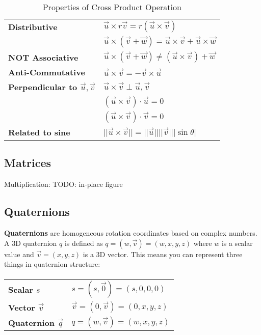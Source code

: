 \documentclass{article}
\begin{document}
\begin{table}[H]
	\centering
	\begin{tabular}{ll}
	\textbf{Distributive} & $ \vec{u} \times r \vec{v} = r(\vec{u} \times \vec{v}) $ \\
	& $ \vec{u} \times (\vec{v} + \vec{w}) =  \vec{u} \times \vec{v} + \vec{u} \times \vec{w} $ \\
	\textbf{NOT Associative} & $\vec{u} \times (\vec{v} + \vec{w}) \neq (\vec{u} \times \vec{v}) + \vec{w} $ \\
	\textbf{Anti-Commutative} & $\vec{u} \times \vec{v} = -\vec{v} \times \vec{u}$ \\
	\textbf{Perpendicular to $\vec{u},\vec{v}$} & $ \vec{u} \times \vec{v} \perp \vec{u},\vec{v}$ \\
	& $(\vec{u} \times \vec{v}) \cdot \vec{u} = 0$ \\
	& $(\vec{u} \times \vec{v}) \cdot \vec{v} = 0$ \\
	\textbf{Related to sine} & $ ||\vec{u} \times \vec{v}|| = ||\vec{u}|| ||\vec{v}|| |\sin \theta|$ \\
	\end{tabular}
	\caption{Properties of Cross Product Operation}
	\label{tab:cross-product-properties}
\end{table}

\subsection{Matrices}

Multiplication: TODO: in-place figure

\subsection{Quaternions}

\textbf{Quaternions} are homogeneous rotation coordinates based on complex numbers. A 3D quaternion $q$ is defined as $q = (w, \vec{v}) = (w, x, y, z)$ where $w$ is a scalar value and $\vec{v} = (x, y, z)$ is a 3D vector. This means you can represent three things in quaternion structure:
\paragraph{}
\begin{tabular}{ll}
	\textbf{Scalar $s$} & $s = (s, \vec{0}) = (s, 0, 0, 0)$ \\
	\textbf{Vector $\vec{v}$} & $ \vec{v} = (0, \vec{v}) = (0, x, y, z)$ \\
	\textbf{Quaternion $\vec{q}$} & $ q = (w, \vec{v}) = (w, x, y, z)$ \\
\end{tabular}
\end{document}
